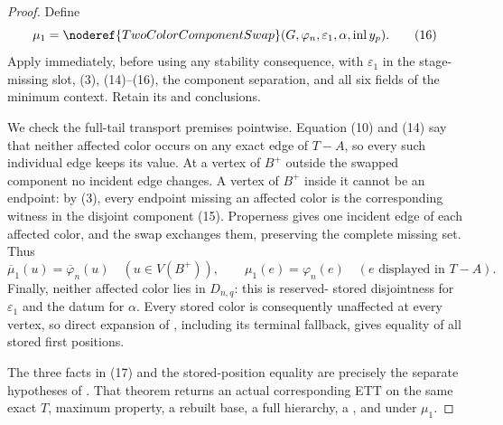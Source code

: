 \begin{proof}
Define
\[
 \mu_1=\noderef{TwoColorComponentSwap}
   (G,\varphi_n,\varepsilon_1,\alpha,\operatorname{inl}y_p). \tag{16}
\]
Apply  immediately, before using any
stability consequence, with \(\varepsilon_1\) in the stage-missing
slot, (3), (14)--(16), the component separation, and all six fields of
the minimum context.  Retain its
 and  conclusions.

We check the full-tail transport premises pointwise.  Equation (10) and
(14) say that neither affected color occurs on any exact edge of
\(T-A\), so every such individual edge keeps its value.  At a vertex
of \(B^+\) outside the swapped component no incident edge changes.  A
vertex of \(B^+\) inside it cannot be an endpoint: by (3), every endpoint
missing an affected color is the corresponding witness in the disjoint
component (15).  Properness gives one incident edge of each affected
color, and the swap exchanges them, preserving the complete missing set.
Thus
\[
 \overline\mu_1(u)=\overline\varphi_n(u)\quad(u\in V(B^+)),
 \qquad \mu_1(e)=\varphi_n(e)\quad(e\text{ displayed in }T-A).\tag{17}
\]
Finally, neither affected color lies in \(D_{n,q}\): this is reserved-
stored disjointness for \(\varepsilon_1\) and the datum for \(\alpha\).
Every stored color is consequently unaffected at every vertex, so direct
expansion of , including its
terminal fallback, gives equality of all stored first positions.

The three facts in (17) and the stored-position equality are precisely
the separate hypotheses of
.  That theorem returns an
actual corresponding ETT on the same exact \(T\), maximum property, a
rebuilt base, a full hierarchy, a , and
 under \(\mu_1\).


\end{proof}
